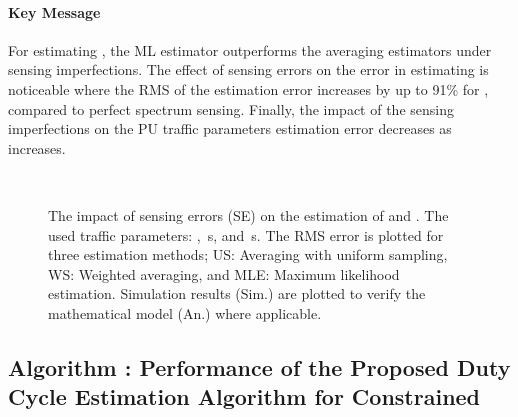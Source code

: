 \documentclass[11pt,draftclsnofoot,journal,onecolumn]{IEEEtran}
\begin{document}
\paragraph*{Key Message}

For estimating , the ML estimator outperforms the averaging estimators under sensing imperfections. The effect of sensing errors on the error in estimating  is noticeable where the RMS of the estimation error increases by up to 91\% for , compared to perfect spectrum sensing. Finally, the impact of the sensing imperfections on the PU traffic parameters estimation error decreases as  increases.

\begin{figure}
\centering
{}\\
\caption{The impact of sensing errors (SE) on the estimation of  and . The used traffic parameters: , \,s, and \,s. The RMS error is plotted for three estimation methods; US: Averaging with uniform sampling, WS: Weighted averaging, and MLE: Maximum likelihood estimation. Simulation results (Sim.) are plotted to verify the mathematical model (An.) where applicable.}
\end{figure}

\subsection{Algorithm : Performance of the Proposed Duty Cycle Estimation Algorithm for Constrained }
\label{sec:algorithm_numerical_cons_N}
\end{document}
